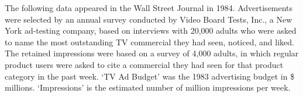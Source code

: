 \documentclass[11pt, chapterprefix=true]{scrbook}\usepackage[]{graphicx}\usepackage[]{color}
\begin{document}

The following data appeared in the Wall Street Journal in 1984.  Advertisements were selected by an annual survey conducted by Video Board Tests, Inc., a New York ad-testing company, based on interviews with 20,000 adults who were asked to name the most outstanding TV commercial they had seen, noticed, and liked. The retained impressions were based on a survey of 4,000 adults, in which regular product users were asked to cite a commercial they had seen for that product category in the past week.  `TV Ad Budget' was the 1983 advertising budget in \$ millions.  `Impressions' is the estimated number of million impressions per week.
\end{document}

